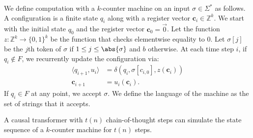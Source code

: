 We define computation with a $k$-counter machine on an input $\sigma \in \Sigma^*$ as follows. A configuration is a finite state $q_i$ along with a register vector $\mathbf c_i \in \mathbb Z^k$.
We start with the initial state $q_0$ and the register vector $\mathbf c_0 = \vec 0$. Let the function $z : \mathbb Z^k \to \{0, 1\}^k$ be the function that checks elementwise equality to $0$.
Let $\sigma[j]$ be the $j$th token of $\sigma$ if $1 \leq j \leq \abs{\sigma}$ and $b$ otherwise.
At each time step $i$, if $q_i \not\in F$, we recurrently update the configuration via:
\begin{align*}
    \langle q_{i+1}, u_i \rangle &= \delta(q_i, \sigma[c_{i,0}], z(\mathbf c_i)) \\
    \mathbf c_{i+1} &= u_i(\mathbf c_i) .
\end{align*}
If $q_i \in F$ at any point, we accept $\sigma$. We define the language of the machine as the set of strings that it accepts.

\begin{theorem}
    A causal transformer with $t(n)$ chain-of-thought steps can simulate the state sequence of a $k$-counter machine for $t(n)$ steps.
\end{theorem}

